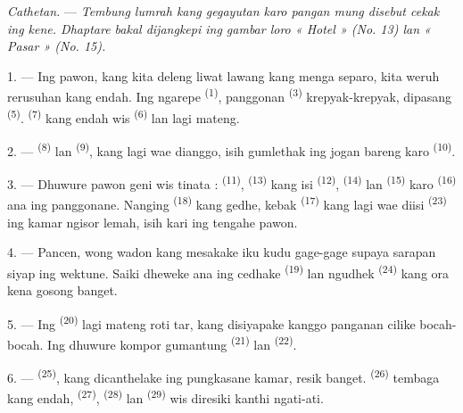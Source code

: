 \textit{Cathetan.} --- \textit{Tembung lumrah kang gegayutan karo
pangan mung disebut cekak ing kene. Dhaptare bakal dijangkepi ing
gambar loro « Hotel » (No. 13) lan « Pasar » (No. 15).}

\VUsaut{4.6mm}
\VUsaut{3.0mm}

1. --- Ing pawon, kang kita deleng liwat lawang kang menga separo,
kita weruh rerusuhan kang endah. Ing ngarepe 
\textsuperscript{(1)}, panggonan  \textsuperscript{(3)}
krepyak-krepyak, dipasang 
\textsuperscript{(5)}.  \textsuperscript{(7)} kang
endah wis  \textsuperscript{(6)} lan lagi mateng.

2. ---  \textsuperscript{(8)} lan  \textsuperscript{(9)}, kang lagi wae dianggo, isih gumlethak ing
jogan bareng karo  \textsuperscript{(10)}.

3. --- Dhuwure pawon geni wis tinata : 
\textsuperscript{(11)},  \textsuperscript{(13)}
kang isi  \textsuperscript{(12)}, 
\textsuperscript{(14)} lan  \textsuperscript{(15)}
karo  \textsuperscript{(16)} ana ing panggonane. Nanging
 \textsuperscript{(18)} kang gedhe, kebak
 \textsuperscript{(17)} kang lagi wae diisi
 \textsuperscript{(23)} ing kamar ngisor lemah, isih
kari ing tengahe pawon.

4. --- Pancen, wong wadon kang mesakake iku kudu gage-gage supaya
sarapan siyap ing wektune. Saiki dheweke ana ing cedhake
 \textsuperscript{(19)} lan ngudhek 
\textsuperscript{(24)} kang ora kena gosong banget.

5. --- Ing  \textsuperscript{(20)} lagi mateng roti tar,
kang disiyapake kanggo panganan cilike bocah-bocah. Ing dhuwure kompor
gumantung  \textsuperscript{(21)} lan 
\textsuperscript{(22)}.

\VUsaut{4.0mm}
\VUsaut{3.0mm}

6. ---  \textsuperscript{(25)}, kang dicanthelake
ing pungkasane kamar, resik banget. 
\textsuperscript{(26)} tembaga kang endah, 
\textsuperscript{(27)},  \textsuperscript{(28)} lan
 \textsuperscript{(29)} wis diresiki kanthi ngati-ati.

